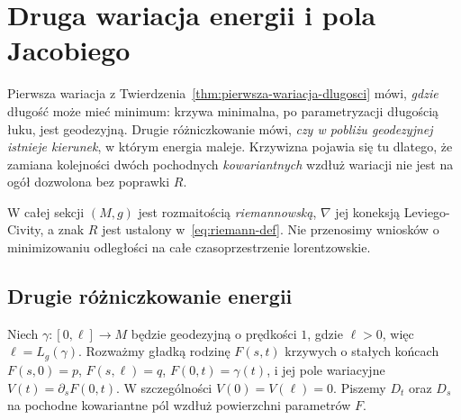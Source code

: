 \section{Druga wariacja energii i pola Jacobiego}
\label{sec:druga-wariacja-jacobi}

Pierwsza wariacja z
Twierdzenia~\ref{thm:pierwsza-wariacja-dlugosci}
mówi, \emph{gdzie} długość może mieć minimum:
krzywa minimalna, po parametryzacji długością łuku,
jest geodezyjną. Drugie różniczkowanie mówi,
\emph{czy w pobliżu geodezyjnej istnieje kierunek},
w którym energia maleje. Krzywizna pojawia się
tu dlatego, że zamiana kolejności dwóch pochodnych
\emph{kowariantnych} wzdłuż wariacji nie jest
na ogół dozwolona bez poprawki $R$.

W całej sekcji $(M,g)$ jest rozmaitością
\emph{riemannowską}, $\nabla$ jej koneksją
Leviego-Civity, a znak $R$ jest ustalony
w~\eqref{eq:riemann-def}. Nie przenosimy
wniosków o minimizowaniu odległości na całe
czasoprzestrzenie lorentzowskie.

\subsection*{Drugie różniczkowanie energii}

Niech $\gamma:[0,\ell]\to M$ będzie geodezyjną
o prędkości $1$, gdzie $\ell>0$, więc $\ell=L_g(\gamma)$.
Rozważmy gładką rodzinę $F(s,t)$ krzywych
o stałych końcach
$F(s,0)=p$, $F(s,\ell)=q$,
$F(0,t)=\gamma(t)$, i jej pole wariacyjne
$V(t)=\partial_sF(0,t)$. W szczególności
$V(0)=V(\ell)=0$. Piszemy $D_t$ oraz $D_s$
na pochodne kowariantne pól wzdłuż powierzchni
parametrów $F$.


